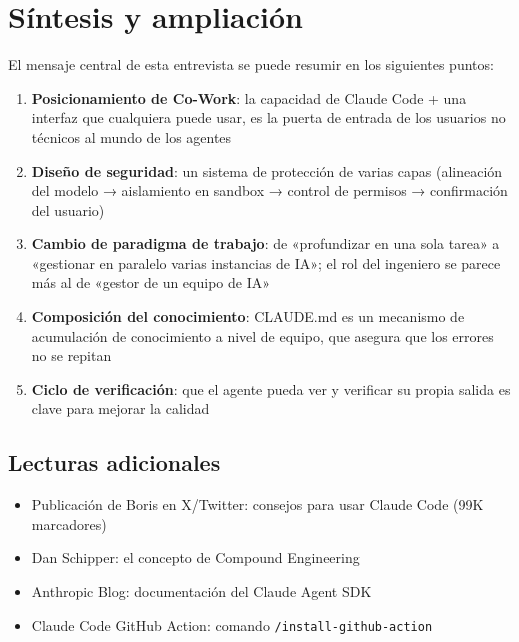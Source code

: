 \section{Síntesis y ampliación}

El mensaje central de esta entrevista se puede resumir en los siguientes puntos:

\begin{enumerate}
    \item \textbf{Posicionamiento de Co-Work}: la capacidad de Claude Code + una interfaz que cualquiera puede usar, es la puerta de entrada de los usuarios no técnicos al mundo de los agentes
    \item \textbf{Diseño de seguridad}: un sistema de protección de varias capas (alineación del modelo → aislamiento en sandbox → control de permisos → confirmación del usuario)
    \item \textbf{Cambio de paradigma de trabajo}: de «profundizar en una sola tarea» a «gestionar en paralelo varias instancias de IA»; el rol del ingeniero se parece más al de «gestor de un equipo de IA»
    \item \textbf{Composición del conocimiento}: CLAUDE.md es un mecanismo de acumulación de conocimiento a nivel de equipo, que asegura que los errores no se repitan
    \item \textbf{Ciclo de verificación}: que el agente pueda ver y verificar su propia salida es clave para mejorar la calidad
\end{enumerate}

\subsection{Lecturas adicionales}

\begin{itemize}
    \item Publicación de Boris en X/Twitter: consejos para usar Claude Code (99K marcadores)
    \item Dan Schipper: el concepto de Compound Engineering
    \item Anthropic Blog: documentación del Claude Agent SDK
    \item Claude Code GitHub Action: comando \texttt{/install-github-action}
\end{itemize}



